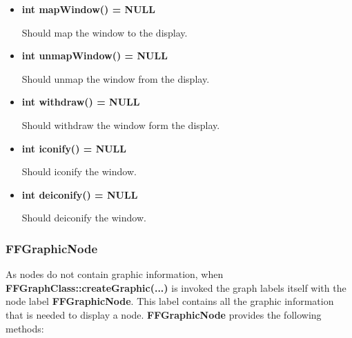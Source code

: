 \begin{itemize}
  Should somehow indicate that the window is not busy, e.g. by
  changing the mouse cursor.

\item{\bf int mapWindow() = NULL}

Should map the window to the display.

\item{\bf int unmapWindow() = NULL}

Should unmap the window from the display.

\item{\bf int withdraw() = NULL}

Should withdraw the window form the display.

\item{\bf int iconify() = NULL}

Should iconify the window.

\item{\bf int deiconify() = NULL}

Should deiconify the window.


\end{itemize}

\subsubsection{FFGraphicNode}
\label{ffgraphicnode}

As nodes do not contain graphic information, when {\bf
  FFGraphClass::createGraphic(...)} is invoked the graph labels
itself with the node label {\bf FFGraphicNode}. This label
contains all the graphic information that is needed to display a
node. {\bf FFGraphicNode} provides the following methods:

